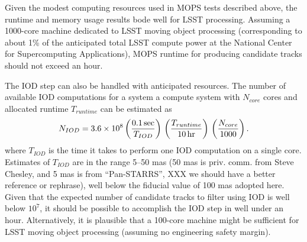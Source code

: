 Given the modest computing resources used in MOPS tests described above, the runtime and memory
usage results bode well for LSST processing. Assuming a 1000-core machine dedicated to LSST moving
object processing (corresponding to about 1\% of the anticipated total LSST compute power at the
National Center for Supercomputing Applications), MOPS runtime for producing
candidate tracks should not exceed an hour.

The IOD step can also be handled with anticipated resources. The number of available IOD computations
for a system a compute system with $N_{core}$ cores and allocated runtime $T_{runtime}$ can be estimated
as
\begin{equation}
  N_{IOD} = 3.6\times10^8 \left({ 0.1\,{\rm sec} \over T_{IOD}}\right) \,
                                         \left({ T_{runtime}  \over 10\,{\rm hr} }\right) \,
                                         \left({ N_{core}  \over 1000}\right).
\end{equation}
where $T_{IOD}$ is the time it takes to perform one IOD computation on a single core. Estimates
of $T_{IOD}$ are in the range 5--50 mas (50 mas is priv. comm. from Steve Chesley, and 5 mas is
from ``Pan-STARRS'', XXX we should have a better reference or rephrase), well below the fiducial
value of 100 mas adopted here. Given that the expected number of candidate tracks to filter using
IOD is well below $10^7$, it should be possible to accomplish the IOD step in well under an hour.
Alternatively, it is plausible that a 100-core machine might be sufficient for LSST moving object
processing (assuming no engineering safety margin).
